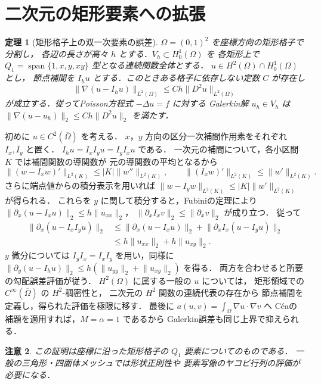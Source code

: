 \documentclass[a5paper,10pt,onecolumn]{jsarticle}
\makeatletter
\theoremstyle{mathnotetheorem}
\newtheorem{theorem}{定理}[section]
\newtheorem{remark}[theorem]{注意}
\renewcommand{\proofname}{証明}
\renewenvironment{proof}[1][\proofname]{%
  \par\pushQED{\qed}\normalfont\topsep4\p@\@plus2\p@\relax
  \trivlist\item[\hskip\labelsep\bfseries #1]\ignorespaces
}{\popQED\endtrivlist\@endpefalse}
\newcommand{\norm}[1]{\lVert #1\rVert}
\makeatother
\begin{document}
\section{二次元の矩形要素への拡張}
\begin{theorem}[矩形格子上の双一次要素の誤差]
$\Omega=(0,1)^2$ を座標方向の矩形格子で分割し，
各辺の長さが高々 $h$ とする．$V_h\subset H_0^1(\Omega)$ を
各矩形上で $Q_1=\operatorname{span}\{1,x,y,xy\}$ 型となる連続関数全体とする．
$u\in H^2(\Omega)\cap H_0^1(\Omega)$ とし，
節点補間を $I_hu$ とする．このときある格子に依存しない定数 $C$ が存在し
\[
 \norm{\nabla(u-I_hu)}_{L^2(\Omega)}
 \le Ch\norm{D^2u}_{L^2(\Omega)}
\]
が成立する．従ってPoisson方程式 $-\Delta u=f$ に対する
Galerkin解 $u_h\in V_h$ は
$\norm{\nabla(u-u_h)}_2\le Ch\norm{D^2u}_2$ を満たす．
\end{theorem}
\begin{proof}
初めに $u\in C^2(\overline\Omega)$ を考える．
$x$，$y$ 方向の区分一次補間作用素をそれぞれ $I_x,I_y$ と置く．
$I_hu=I_xI_yu=I_yI_xu$ である．
一次元の補間について，各小区間 $K$ では補間関数の導関数が
元の導関数の平均となるから
\[
 \norm{(w-I_xw)'}_{L^2(K)}\le |K|\norm{w''}_{L^2(K)},
 \qquad\norm{(I_xw)'}_{L^2(K)}\le\norm{w'}_{L^2(K)}.
\]
さらに端点値からの積分表示を用いれば
$\norm{w-I_yw}_{L^2(K)}\le |K|\norm{w'}_{L^2(K)}$ が得られる．
これらを $y$ に関して積分すると，Fubiniの定理により
$\norm{\partial_x(u-I_xu)}_2\le h\norm{u_{xx}}_2$，
$\norm{\partial_xI_xv}_2\le\norm{\partial_xv}_2$ が成り立つ．
従って
\[
 \begin{aligned}
 \norm{\partial_x(u-I_xI_yu)}_2
 &\le\norm{\partial_x(u-I_xu)}_2
 +\norm{\partial_xI_x(u-I_yu)}_2\\
 &\le h\norm{u_{xx}}_2+h\norm{u_{xy}}_2.
 \end{aligned}
\]
$y$ 微分については $I_yI_x=I_xI_y$ を用い，同様に
$\norm{\partial_y(u-I_hu)}_2
 \le h(\norm{u_{yy}}_2+\norm{u_{xy}}_2)$ を得る．
両方を合わせると所要の勾配誤差評価が従う．
$H^2(\Omega)$ に属する一般の $u$ については，
矩形領域での $C^\infty(\overline\Omega)$ の $H^2$-稠密性と，
二次元の $H^2$ 関数の連続代表の存在から
節点補間を定義し，得られた評価を極限に移す．
最後に $a(u,v)=\int_\Omega\nabla u\cdot\nabla v$ へ
C\'eaの補題を適用すれば，$M=\alpha=1$ であるから
Galerkin誤差も同じ上界で抑えられる．
\end{proof}
\begin{remark}
この証明は座標に沿った矩形格子の $Q_1$ 要素についてのものである．
一般の三角形・四面体メッシュでは形状正則性や
要素写像のヤコビ行列の評価が必要になる．
\end{remark}
\end{document}
